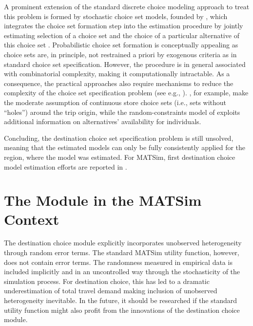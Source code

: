 A prominent extension of the standard discrete choice modeling approach to treat this problem is formed by stochastic choice set models, founded by \citet[][]{Manski_TD_1977, BurnettKPHanson_TRR_1979, BurnettKP_UG_1980}, which integrates the choice set formation step into the estimation procedure by jointly estimating selection of a choice set and the choice of a particular alternative of this choice set \citep[][]{KaplanEtAl_TRB_2009, PagliaraTimmermans_TransLett_2009, Manski_TD_1977, Swait_TransResPartB_2001, HorowitzLouviere_IJRM_1995, BenAkivaBoccara_IJRM_1995, SwaitBenAkiva_TransResPartB_1987, Swait_TransResPartB_2001, MartinezEtAl_TransResPartB_2009, CascettaPapola_TransResPartA_2009, BierlaireEtAl_2_STRC_2009, ScroginEtAl_TechRep_UCF_2004, ManraiAndrews_EJOR_1998, Ansah_TransRes_1977}. Probabilistic choice set formation is conceptually appealing as choice sets are, in principle, not restrained a priori by exogenous criteria as in standard choice set specification. However, the procedure is in general associated with combinatorial complexity, making it computationally intractable. As a consequence, the practical approaches also require mechanisms to reduce the complexity of the choice set specification problem (see e.g., \citet[][p.11]{BenAkivaBoccara_IJRM_1995}). \citet[][]{ZhengJieGuo_TRB_2008}, for example, make the moderate assumption of continuous store choice sets (i.e., sets without ``holes'') around the trip origin, while the random-constraints model of \citet[][]{BenAkivaBoccara_IJRM_1995} exploits additional information on alternatives' availability for individuals.

Concluding, the destination choice set specification problem is still unsolved, meaning that the estimated models can only be fully consistently applied for the region, where the model was estimated. For MATSim, first destination choice model estimation efforts are reported in \citet[][Chapter 5]{Horni_PhDThesis_2013}.

\section{The Module in the MATSim Context}
The destination choice module explicitly incorporates unobserved heterogeneity through random error terms. The standard MATSim utility function, however, does not contain error terms. The randomness measured in empirical data is included implicitly and in an uncontrolled way through the stochasticity of the simulation process. For destination choice, this has led to a dramatic underestimation of total travel demand making inclusion of unobserved heterogeneity inevitable. In the future, it should be researched if the standard utility function might also profit from the innovations of the destination choice module.

